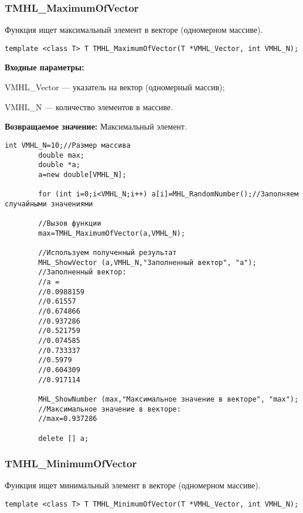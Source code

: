 \documentclass[a4paper,12pt]{article}
\begin{document}
\subsubsection{TMHL\_MaximumOfVector}\label{TMHL_MaximumOfVector}

Функция ищет максимальный элемент в векторе (одномерном массиве).


\begin{lstlisting}[label=code_syntax_TMHL_MaximumOfVector,caption=Синтаксис]
template <class T> T TMHL_MaximumOfVector(T *VMHL_Vector, int VMHL_N);
\end{lstlisting}

\textbf{Входные параметры:}

 VMHL\_Vector --- указатель на вектор (одномерный массив);
 
 VMHL\_N --- количество элементов в массиве.

\textbf{Возвращаемое значение:}
Максимальный элемент.


\begin{lstlisting}[label=code_use_TMHL_MaximumOfVector,caption=Пример использования]
        int VMHL_N=10;//Размер массива
        double max;
        double *a;
        a=new double[VMHL_N];

        for (int i=0;i<VMHL_N;i++) a[i]=MHL_RandomNumber();//Заполняем случайными значениями

        //Вызов функции
        max=TMHL_MaximumOfVector(a,VMHL_N);

        //Используем полученный результат
        MHL_ShowVector (a,VMHL_N,"Заполненный вектор", "a");
        //Заполненный вектор:
        //a =
        //0.0988159
        //0.61557
        //0.674866
        //0.937286
        //0.521759
        //0.074585
        //0.733337
        //0.5979
        //0.604309
        //0.917114

        MHL_ShowNumber (max,"Максимальное значение в векторе", "max");
        //Максимальное значение в векторе:
        //max=0.937286

        delete [] a;
\end{lstlisting}

\subsubsection{TMHL\_MinimumOfVector}\label{TMHL_MinimumOfVector}

Функция ищет минимальный элемент в векторе (одномерном массиве).


\begin{lstlisting}[label=code_syntax_TMHL_MinimumOfVector,caption=Синтаксис]
template <class T> T TMHL_MinimumOfVector(T *VMHL_Vector, int VMHL_N);
\end{lstlisting}
\end{document}
